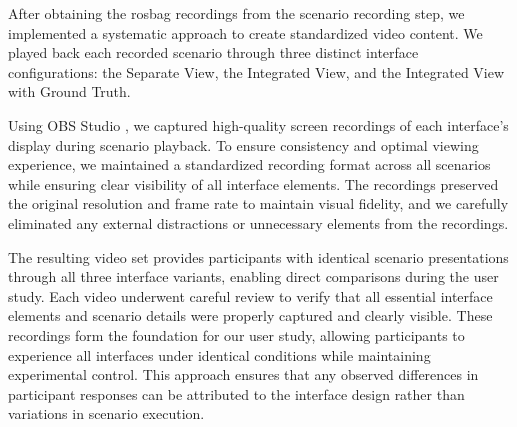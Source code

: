 After obtaining the rosbag recordings from the scenario recording step, we implemented a systematic approach to create standardized video content. We played back each recorded scenario through three distinct interface configurations: the Separate View, the Integrated View, and the Integrated View with Ground Truth.

Using OBS Studio \cite{obs2024}, we captured high-quality screen recordings of each interface's display during scenario playback. To ensure consistency and optimal viewing experience, we maintained a standardized recording format across all scenarios while ensuring clear visibility of all interface elements. The recordings preserved the original resolution and frame rate to maintain visual fidelity, and we carefully eliminated any external distractions or unnecessary elements from the recordings.

The resulting video set provides participants with identical scenario presentations through all three interface variants, enabling direct comparisons during the user study. Each video underwent careful review to verify that all essential interface elements and scenario details were properly captured and clearly visible. These recordings form the foundation for our user study, allowing participants to experience all interfaces under identical conditions while maintaining experimental control. This approach ensures that any observed differences in participant responses can be attributed to the interface design rather than variations in scenario execution.